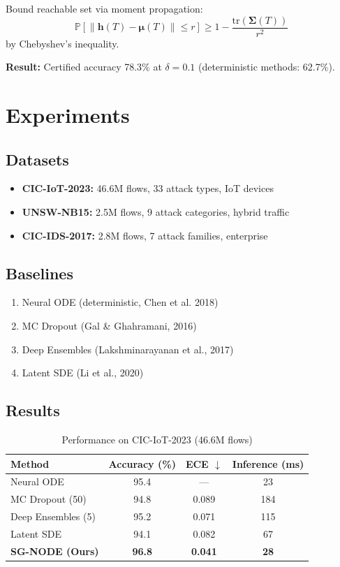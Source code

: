 \documentclass{article}
\begin{document}
Bound reachable set via moment propagation:
\begin{equation}
\mathbb{P}[\|\mathbf{h}(T) - \boldsymbol{\mu}(T)\| \leq r] \geq 1 - \frac{\text{tr}(\boldsymbol{\Sigma}(T))}{r^2}
\end{equation}
by Chebyshev's inequality.

\textbf{Result:} Certified accuracy 78.3\% at $\delta = 0.1$ (deterministic methods: 62.7\%).

\section{Experiments}

\subsection{Datasets}

\begin{itemize}
\item \textbf{CIC-IoT-2023:} 46.6M flows, 33 attack types, IoT devices
\item \textbf{UNSW-NB15:} 2.5M flows, 9 attack categories, hybrid traffic
\item \textbf{CIC-IDS-2017:} 2.8M flows, 7 attack families, enterprise
\end{itemize}

\subsection{Baselines}

\begin{enumerate}
\item Neural ODE (deterministic, Chen et al. 2018)
\item MC Dropout (Gal \& Ghahramani, 2016)
\item Deep Ensembles (Lakshminarayanan et al., 2017)
\item Latent SDE (Li et al., 2020)
\end{enumerate}

\subsection{Results}

\begin{table}[h]
\centering
\caption{Performance on CIC-IoT-2023 (46.6M flows)}
\begin{tabular}{lccc}
\toprule
Method & Accuracy (\%) & ECE $\downarrow$ & Inference (ms) \\
\midrule
Neural ODE & 95.4 & --- & 23 \\
MC Dropout (50) & 94.8 & 0.089 & 184 \\
Deep Ensembles (5) & 95.2 & 0.071 & 115 \\
Latent SDE & 94.1 & 0.082 & 67 \\
\textbf{SG-NODE (Ours)} & \textbf{96.8} & \textbf{0.041} & \textbf{28} \\
\bottomrule
\end{tabular}
\end{table}
\end{document}
